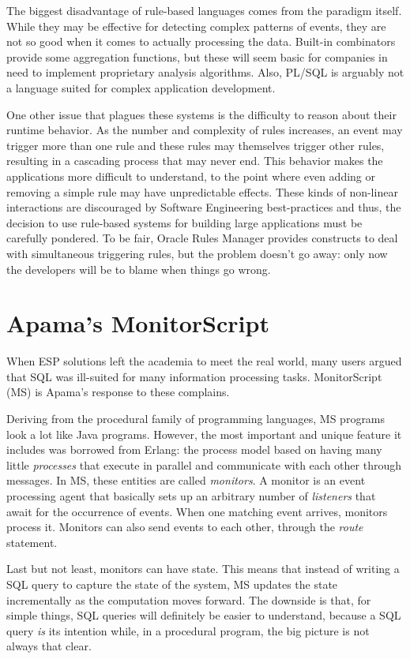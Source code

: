 \documentclass{report}
\begin{document}
The biggest disadvantage of rule-based languages comes from the paradigm itself. While they may be effective for detecting complex patterns of events, they are not so good when it comes to actually processing the data. Built-in combinators provide some aggregation functions, but these will seem basic for companies in need to implement proprietary analysis algorithms. Also, PL/SQL is arguably not a language suited for complex application development.

One other issue that plagues these systems is the difficulty to reason about their runtime behavior. As the number and complexity of rules increases, an event may trigger more than one rule and these rules may themselves trigger other rules, resulting in a cascading process that may never end. This behavior makes the applications more difficult to understand, to the point where even adding or removing a simple rule may have unpredictable effects. These kinds of non-linear interactions are discouraged by Software Engineering best-practices and thus, the decision to use rule-based systems for building large applications must be carefully pondered. To be fair, Oracle Rules Manager provides constructs to deal with simultaneous triggering rules, but the problem doesn't go away: only now the developers will be to blame when things go wrong.

\section{Apama's MonitorScript}

When ESP solutions left the academia to meet the real world, many users argued that SQL was ill-suited for many information processing tasks. MonitorScript (MS) is Apama's response to these complains.

Deriving from the procedural family of programming languages, MS programs look a lot like Java programs. However, the most important and unique feature it includes was borrowed from Erlang: the process model based on having many little \emph{processes} that execute in parallel and communicate with each other through messages. In MS, these entities are called \emph{monitors}. A monitor is an event processing agent that basically sets up an arbitrary number of \emph{listeners} that await for the occurrence of events. When one matching event arrives, monitors process it. Monitors can also send events to each other, through the \emph{route} statement.

Last but not least, monitors can have state. This means that instead of writing a SQL query to capture the state of the system, MS updates the state incrementally as the computation moves forward. The downside is that, for simple things, SQL queries will definitely be easier to understand, because a SQL query \emph{is} its intention while, in a procedural program, the big picture is not always that clear.
\end{document}
